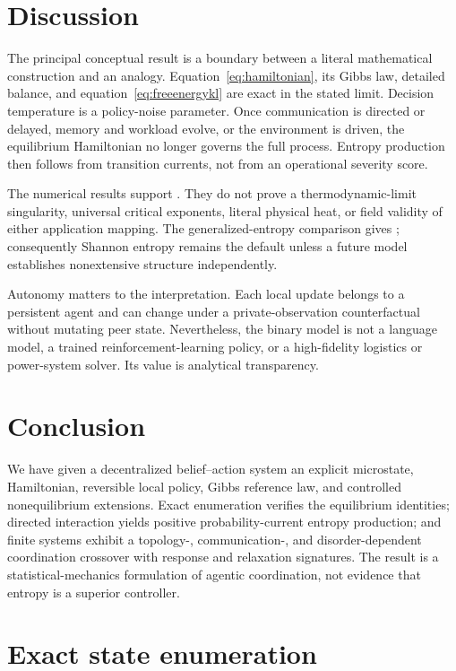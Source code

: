 \documentclass[12pt]{article}
\begin{document}
\FloatBarrier

\section{Discussion}

The principal conceptual result is a boundary between a literal mathematical
construction and an analogy. Equation~\eqref{eq:hamiltonian}, its Gibbs law,
detailed balance, and equation~\eqref{eq:freeenergykl} are exact in the stated
limit. Decision temperature is a policy-noise parameter. Once communication is
directed or delayed, memory and workload evolve, or the environment is driven,
the equilibrium Hamiltonian no longer governs the full process. Entropy
production then follows from transition currents, not from an operational
severity score.

The numerical results support \ResultOverallClaim. They do not prove a
thermodynamic-limit singularity, universal critical exponents, literal physical
heat, or field validity of either application mapping. The generalized-entropy
comparison gives \ResultTsallisDetail; consequently Shannon entropy remains the
default unless a future model establishes nonextensive structure independently.

Autonomy matters to the interpretation. Each local update belongs to a
persistent agent and can change under a private-observation counterfactual
without mutating peer state. Nevertheless, the binary model is not a language
model, a trained reinforcement-learning policy, or a high-fidelity logistics or
power-system solver. Its value is analytical transparency.

\section{Conclusion}

We have given a decentralized belief--action system an explicit microstate,
Hamiltonian, reversible local policy, Gibbs reference law, and controlled
nonequilibrium extensions. Exact enumeration verifies the equilibrium
identities; directed interaction yields positive probability-current entropy
production; and finite systems exhibit a topology-, communication-, and
disorder-dependent coordination crossover with response and relaxation
signatures. The result is a statistical-mechanics formulation of agentic
coordination, not evidence that entropy is a superior controller.

\appendix
\section{Exact state enumeration}
\end{document}
